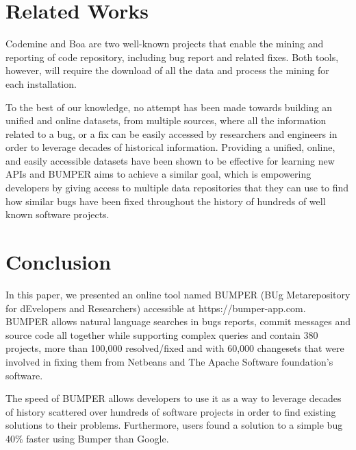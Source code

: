 \documentclass[conference]{IEEEtran}
\begin{document}
\section{Related Works}
\label{sec:Related Works}

Codemine \cite{Czerwonka2013} and Boa \cite{Bizer2011} are two well-known projects that enable the mining and reporting of code repository, including bug report and related fixes.
Both tools, however, will require the download of all the data and process the mining for each installation.

To the best of our knowledge, no attempt has been made towards building an unified and online datasets, from multiple sources, where all the information related to a bug, or a fix can be easily accessed by researchers and engineers in order to leverage decades of historical information.
Providing a unified, online, and easily accessible datasets have been shown to be effective for learning new APIs\cite{Montandon2013,Rahman2013} and BUMPER aims to achieve a similar goal, which is empowering developers by giving access to multiple data repositories that they can use to find how similar bugs have been fixed throughout the history of hundreds of well known software projects.


\section{Conclusion}
\label{sec:conclusion}

In this paper, we presented an online tool named BUMPER (BUg Metarepository for dEvelopers and Researchers) accessible at https://bumper-app.com. BUMPER allows natural language searches in bugs reports, commit messages and source code all together while supporting complex queries and contain 380 projects, more than 100,000 resolved/fixed and with 60,000 changesets that were involved in fixing them from Netbeans and The Apache Software foundation’s software.

The speed of BUMPER allows developers to use it as a way to leverage decades of history scattered over hundreds of software projects in order to find existing solutions to their problems.
Furthermore, users found a solution to a simple bug 40\% faster using Bumper than Google.




\end{document}
